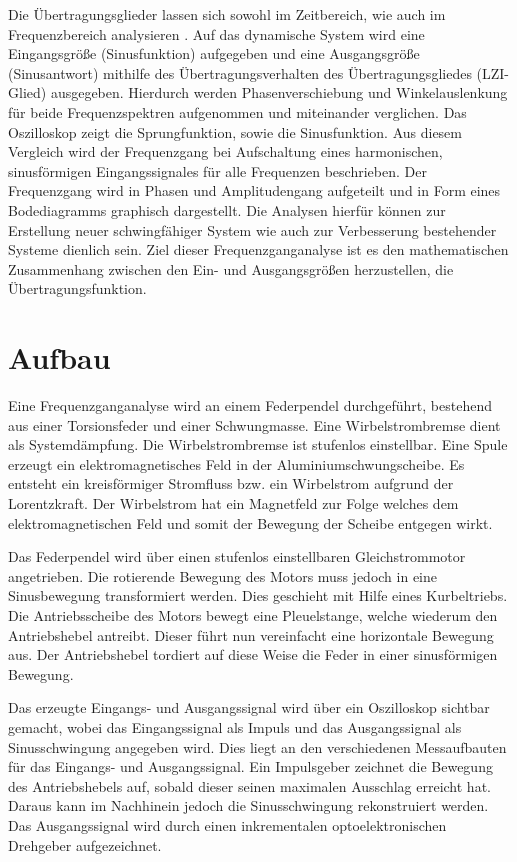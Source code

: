 \documentclass[a4paper,12pt]{scrartcl}
\begin{document}
Die Übertragungsglieder lassen sich sowohl im Zeitbereich, wie auch im Frequenzbereich analysieren \cite{RegTech}.
Auf das dynamische System wird eine Eingangsgröße (Sinusfunktion) aufgegeben und eine Ausgangsgröße (Sinusantwort) mithilfe des Übertragungs\-verhalten des Übertragungsgliedes (LZI-Glied) ausgegeben.
Hierdurch werden Phasenverschiebung und Winkelauslenkung für beide Frequenzspektren aufgenommen und miteinander verglichen.
Das Oszilloskop zeigt die Sprungfunktion, sowie die Sinusfunktion.
Aus diesem Vergleich wird der Frequenzgang bei Aufschaltung eines harmonischen, sinusförmigen Eingangssignales für alle Frequenzen beschrieben.
Der Frequenzgang wird in Phasen und Amplitudengang aufgeteilt und in Form eines Bodediagramms graphisch dargestellt.
Die Analysen hierfür können zur Erstellung neuer schwingfähiger System wie auch zur Verbesserung bestehender Systeme dienlich sein.
Ziel dieser Frequenzganganalyse ist es den mathematischen Zusammenhang zwischen den Ein- und Ausgangsgrößen herzustellen, die Übertragungsfunktion.

\section{Aufbau}

Eine Frequenzganganalyse wird an einem Federpendel durchgeführt, bestehend aus einer Torsionsfeder und einer Schwungmasse. 
Eine Wirbelstrombremse dient als Systemdämpfung. Die Wirbelstrombremse ist stufenlos einstellbar. Eine Spule erzeugt ein elektromagnetisches 
Feld in der Aluminiumschwungscheibe. Es entsteht ein kreisförmiger Stromfluss bzw. ein Wirbelstrom aufgrund der Lorentzkraft.  
Der Wirbelstrom hat ein Magnetfeld zur Folge welches dem elektromagnetischen Feld und somit der Bewegung der Scheibe entgegen wirkt. 

Das Federpendel wird über einen stufenlos einstellbaren Gleichstrommotor angetrieben. Die rotierende Bewegung des Motors muss jedoch in eine 
Sinusbewegung transformiert werden. Dies geschieht mit Hilfe eines Kurbeltriebs. Die Antriebsscheibe des Motors bewegt eine Pleuelstange, 
welche wiederum den Antriebshebel antreibt. Dieser führt nun vereinfacht eine horizontale Bewegung aus. 
Der Antriebshebel tordiert auf diese Weise die Feder in einer sinusförmigen Bewegung. 

Das erzeugte Eingangs- und Ausgangssignal wird über ein Oszilloskop sichtbar gemacht, wobei das Eingangssignal als Impuls und das Ausgangssignal 
als Sinusschwingung angegeben wird. Dies liegt an den verschiedenen Messaufbauten für das Eingangs- und Ausgangssignal. Ein Impulsgeber zeichnet 
die Bewegung des Antriebshebels auf, sobald dieser seinen maximalen Ausschlag erreicht hat. Daraus kann im Nachhinein jedoch die Sinusschwingung 
rekonstruiert werden. Das Ausgangssignal wird durch einen inkrementalen optoelektronischen Drehgeber aufgezeichnet. 
\end{document}
